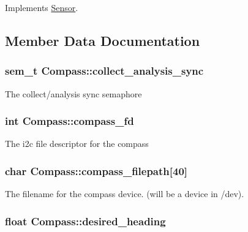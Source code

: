 Implements \hyperlink{classSensor_acf4ff5c6c8f793ed47a8105b94ff7c3e}{Sensor}.



\subsection{Member Data Documentation}
\hypertarget{classCompass_ace6e13b91461366609f093fef09188d9}{
\subsubsection[{collect\-\_\-analysis\-\_\-sync}]{\setlength{\rightskip}{0pt plus 5cm}sem\-\_\-t Compass\-::collect\-\_\-analysis\-\_\-sync\hspace{0.3cm}{\ttfamily [protected]}}}\label{classCompass_ace6e13b91461366609f093fef09188d9}
The collect/analysis sync semaphore \hypertarget{classCompass_a44b0e4223918e3b139e54d54a0e3daad}{
\subsubsection[{compass\-\_\-fd}]{\setlength{\rightskip}{0pt plus 5cm}int Compass\-::compass\-\_\-fd\hspace{0.3cm}{\ttfamily [protected]}}}\label{classCompass_a44b0e4223918e3b139e54d54a0e3daad}
The i2c file descriptor for the compass \hypertarget{classCompass_a6ff33d93efe79539c75dbee45efdc97c}{
\subsubsection[{compass\-\_\-filepath}]{\setlength{\rightskip}{0pt plus 5cm}char Compass\-::compass\-\_\-filepath\mbox{[}40\mbox{]}\hspace{0.3cm}{\ttfamily [protected]}}}\label{classCompass_a6ff33d93efe79539c75dbee45efdc97c}
The filename for the compass device. (will be a device in /dev). \hypertarget{classCompass_ac888a4dacdc477e53c99fe8e110966ae}{
\subsubsection[{desired\-\_\-heading}]{\setlength{\rightskip}{0pt plus 5cm}float Compass\-::desired\-\_\-heading\hspace{0.3cm}{\ttfamily [protected]}}}\label{classCompass_ac888a4dacdc477e53c99fe8e110966ae}
